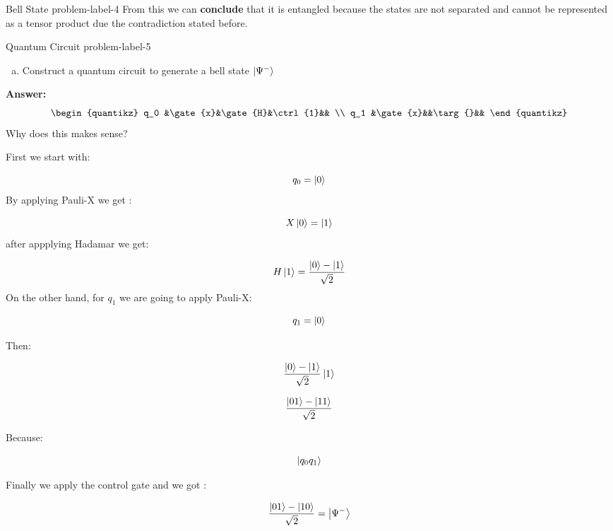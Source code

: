 \begin{problem}{Bell State }{problem-label-4}
	From this we can \textbf{conclude} that it is entangled because the states are not separated and cannot be represented as a tensor product due the contradiction stated before.
\end{problem}

\begin{problem}{Quantum Circuit }{problem-label-5}
	
	\begin{enumerate}[(a)]
		\item Construct a quantum circuit to generate a bell state $\ket{\Psi^-}$
	\end{enumerate}
	\textbf{Answer:}\\
\[
	\begin{quantikz}
	q_0 &\gate{x}&\gate{H}&\ctrl{1}&& \\
	q_1 &\gate{x}&&\targ{}&&
\end{quantikz}
\]
Why does this makes sense?

First we start with:

\[
q_0 = \ket{0} 
\]
By applying Pauli-X we get :

\[
X\ket{0}=\ket{1}
\]
after appplying Hadamar we get:

\[
H\ket{1} = \frac{\ket{0}-\ket{1}}{\sqrt{2}}
\]
On the other hand, for $q_1$ we are going to apply Pauli-X:

\[
q_1 = \ket{0}
\]

Then:

\[
\frac{\ket{0}-\ket{1}}{\sqrt{2}} \ket{1}
\]

\[
\frac{\ket{01}-\ket{11}}{\sqrt{2}} 
\]

Because:

\[
\ket{q_0 q_1}
\]

Finally we apply the control gate and we got :

\[
\frac{\ket{01}-\ket{10}}{\sqrt{2}} = \ket{\Psi^-} 
\]
\end{problem}

